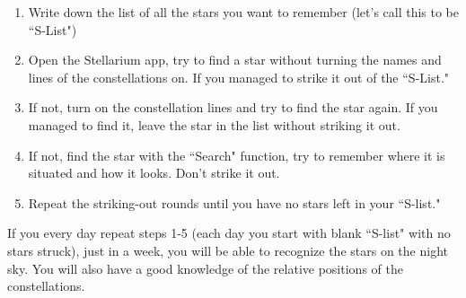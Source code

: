 \documentclass[a4paper,12pt]{extarticle}
\begin{document}
\begin{enumerate}[1.]
	\item  Write down the list of all the stars you want to remember (let's call this to be ``S-List")
	\item Open the Stellarium app, try to find a star without turning the names and lines of the constellations on. If you managed to strike it out of the ``S-List."
	\item If not, turn on the constellation lines and try to find the star again. If you managed to find it, leave the star in the list without striking it out.
	\item If not, find the star with the ``Search" function, try to remember where it is situated and how it looks. Don't strike it out.
	\item  Repeat the striking-out rounds until you have no stars left in your ``S-list."
\end{enumerate}

If you every day repeat steps 1-5 (each day you start with blank ``S-list" with no stars struck), just in a week, you will be able to recognize the stars on the night sky. You will also have a good knowledge of the relative positions of the constellations.
\end{document}
